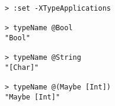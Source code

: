 \begin{repl}\begin{lstlisting}
> :set -XTypeApplications

> typeName @Bool
"Bool"

> typeName @String
"[Char]"

> typeName @(Maybe [Int])
"Maybe [Int]"\end{lstlisting}\end{repl}
